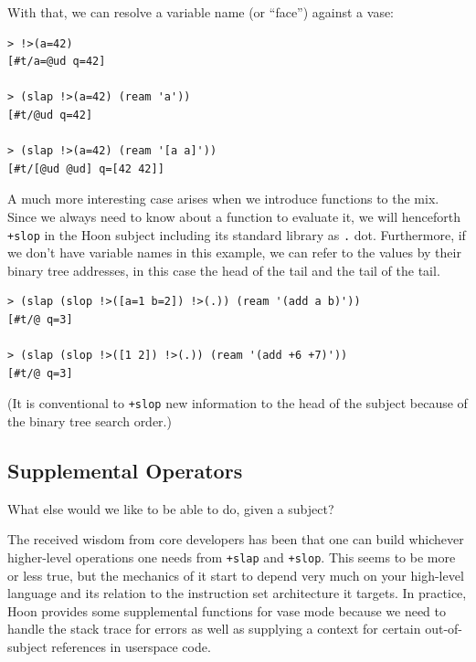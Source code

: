 \documentclass[twoside]{article}
\begin{document}
\noindent
With that, we can resolve a variable name (or “face”) against a vase:

\begin{lstlisting}[style=listingcode]
> !>(a=42)
[#t/a=@ud q=42]

> (slap !>(a=42) (ream 'a'))
[#t/@ud q=42]

> (slap !>(a=42) (ream '[a a]'))
[#t/[@ud @ud] q=[42 42]]
\end{lstlisting}

A much more interesting case arises when we introduce functions to the mix.  Since we always need to know about a function to evaluate it, we will henceforth \lstinline[style=inlinecode]{+slop} in the Hoon subject including its standard library as \lstinline[style=inlinecode]{.} dot.  Furthermore, if we don't have variable names in this example, we can refer to the values by their binary tree addresses, in this case the head of the tail and the tail of the tail.

\begin{lstlisting}[style=listingcode]
> (slap (slop !>([a=1 b=2]) !>(.)) (ream '(add a b)'))
[#t/@ q=3]

> (slap (slop !>([1 2]) !>(.)) (ream '(add +6 +7)'))
[#t/@ q=3]
\end{lstlisting}

\noindent
(It is conventional to \lstinline[style=inlinecode]{+slop} new information to the head of the subject because of the binary tree search order.)

\subsection{Supplemental Operators}

What else would we like to be able to do, given a subject?

The received wisdom from core developers has been that one can build whichever higher-level operations one needs from \lstinline[style=inlinecode]{+slap} and \lstinline[style=inlinecode]{+slop}.  This seems to be more or less true, but the mechanics of it start to depend very much on your high-level language and its relation to the instruction set architecture it targets.  In practice, Hoon provides some supplemental functions for vase mode because we need to handle the stack trace for errors as well as supplying a context for certain out-of-subject references in userspace code.
\end{document}
